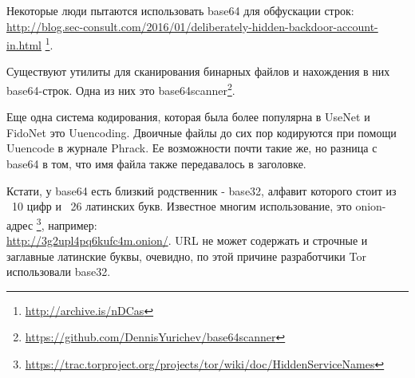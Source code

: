 Некоторые люди пытаются использовать base64 для обфускации строк:
\url{http://blog.sec-consult.com/2016/01/deliberately-hidden-backdoor-account-in.html}
\footnote{\url{http://archive.is/nDCas}}.

Существуют утилиты для сканирования бинарных файлов и нахождения в них base64-строк.
Одна из них это base64scanner\footnote{\url{https://github.com/DennisYurichev/base64scanner}}.

Еще одна система кодирования, которая была более популярна в UseNet и FidoNet это Uuencoding.
Двоичные файлы до сих пор кодируются при помощи Uuencode в журнале Phrack.
Ее возможности почти такие же, но разница с base64 в том, что имя файла также передавалось в заголовке.

Кстати, у base64 есть близкий родственник - base32, алфавит которого стоит из ~10 цифр и ~26 латинских букв.
Известное многим использование, это onion-адрес
\footnote{\url{https://trac.torproject.org/projects/tor/wiki/doc/HiddenServiceNames}},
например: \\
\url{http://3g2upl4pq6kufc4m.onion/}.
\ac{URL} не может содержать и строчные и заглавные латинские буквы, очевидно, по этой причине разработчики Tor
использовали base32.

